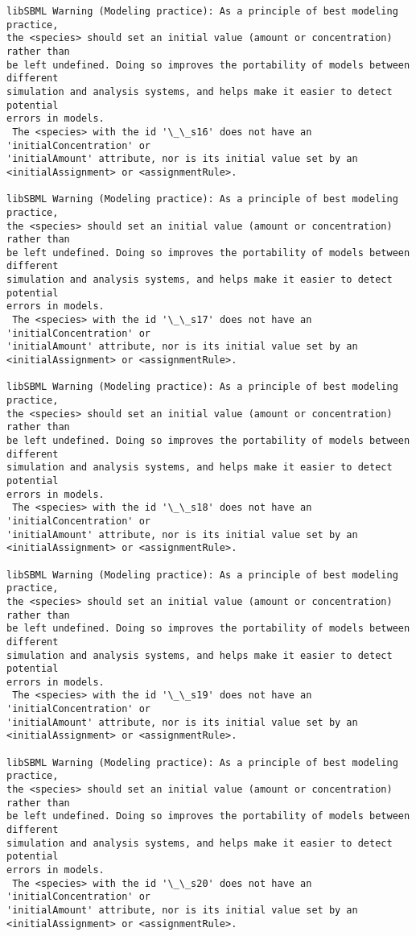 \documentclass[11pt]{article}
\begin{document}
\begin{Verbatim}[commandchars=\\\{\}]
libSBML Warning (Modeling practice): As a principle of best modeling practice,
the <species> should set an initial value (amount or concentration) rather than
be left undefined. Doing so improves the portability of models between different
simulation and analysis systems, and helps make it easier to detect potential
errors in models.
 The <species> with the id '\_\_s16' does not have an 'initialConcentration' or
'initialAmount' attribute, nor is its initial value set by an
<initialAssignment> or <assignmentRule>.

libSBML Warning (Modeling practice): As a principle of best modeling practice,
the <species> should set an initial value (amount or concentration) rather than
be left undefined. Doing so improves the portability of models between different
simulation and analysis systems, and helps make it easier to detect potential
errors in models.
 The <species> with the id '\_\_s17' does not have an 'initialConcentration' or
'initialAmount' attribute, nor is its initial value set by an
<initialAssignment> or <assignmentRule>.

libSBML Warning (Modeling practice): As a principle of best modeling practice,
the <species> should set an initial value (amount or concentration) rather than
be left undefined. Doing so improves the portability of models between different
simulation and analysis systems, and helps make it easier to detect potential
errors in models.
 The <species> with the id '\_\_s18' does not have an 'initialConcentration' or
'initialAmount' attribute, nor is its initial value set by an
<initialAssignment> or <assignmentRule>.

libSBML Warning (Modeling practice): As a principle of best modeling practice,
the <species> should set an initial value (amount or concentration) rather than
be left undefined. Doing so improves the portability of models between different
simulation and analysis systems, and helps make it easier to detect potential
errors in models.
 The <species> with the id '\_\_s19' does not have an 'initialConcentration' or
'initialAmount' attribute, nor is its initial value set by an
<initialAssignment> or <assignmentRule>.

libSBML Warning (Modeling practice): As a principle of best modeling practice,
the <species> should set an initial value (amount or concentration) rather than
be left undefined. Doing so improves the portability of models between different
simulation and analysis systems, and helps make it easier to detect potential
errors in models.
 The <species> with the id '\_\_s20' does not have an 'initialConcentration' or
'initialAmount' attribute, nor is its initial value set by an
<initialAssignment> or <assignmentRule>.


\end{Verbatim}
\end{document}
